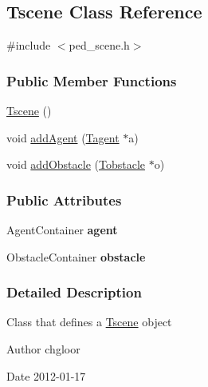 \hypertarget{classTscene}{
\subsection{Tscene Class Reference}
\label{classTscene}
}


{\ttfamily \#include $<$ped\_\-scene.h$>$}

\subsubsection*{Public Member Functions}
\begin{DoxyCompactItemize}
\item 
\hyperlink{classTscene_adb1256bd6b9d7f9b0c8de01f83c2e575}{Tscene} ()
\item 
void \hyperlink{classTscene_a36fff50a82ded29ab55fd3db24fce497}{addAgent} (\hyperlink{classTagent}{Tagent} $\ast$a)
\item 
void \hyperlink{classTscene_a2f297cb181f6f2dc91fb6f92b7b7e0f7}{addObstacle} (\hyperlink{classTobstacle}{Tobstacle} $\ast$o)
\end{DoxyCompactItemize}
\subsubsection*{Public Attributes}
\begin{DoxyCompactItemize}
\item 
\hypertarget{classTscene_a0113d395aa605226d1cc108dbb56670a}{
AgentContainer {\bfseries agent}}
\label{classTscene_a0113d395aa605226d1cc108dbb56670a}

\item 
\hypertarget{classTscene_a0cc090f027c28d96262a64bb29047a49}{
ObstacleContainer {\bfseries obstacle}}
\label{classTscene_a0cc090f027c28d96262a64bb29047a49}

\end{DoxyCompactItemize}


\subsubsection{Detailed Description}
Class that defines a \hyperlink{classTscene}{Tscene} object \begin{DoxyAuthor}{Author}
chgloor 
\end{DoxyAuthor}
\begin{DoxyDate}{Date}
2012-\/01-\/17 
\end{DoxyDate}


